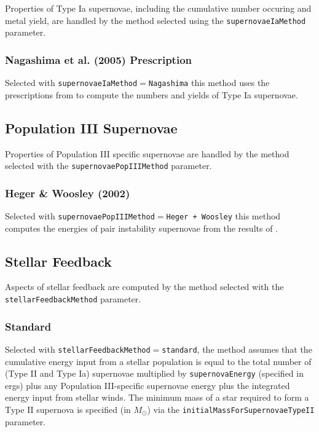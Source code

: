 Properties of Type Ia supernovae, including the cumulative number occuring and metal yield, are handled by the method selected using the {\tt supernovaeIaMethod} parameter.

\subsubsection{Nagashima et al. (2005) Prescription}

Selected with {\tt supernovaeIaMethod}$=${\tt Nagashima} this method uses the prescriptions from \cite{nagashima_metal_2005} to compute the numbers and yields of Type Ia supernovae.

\subsection{Population III Supernovae}

Properties of Population III specific supernovae are handled by the method selected with the {\tt supernovaePopIIIMethod} parameter.

\subsubsection{Heger \& Woosley (2002)}

Selected with {\tt supernovaePopIIIMethod}$=${\tt Heger + Woosley} this method computes the energies of pair instability supernovae from the results of \cite{heger_nucleosynthetic_2002}.

\subsection{Stellar Feedback}

Aspects of stellar feedback are computed by the method selected with the {\tt stellarFeedbackMethod} parameter.

\subsubsection{Standard}

Selected with {\tt stellarFeedbackMethod}$=${\tt standard}, the method assumes that the cumulative energy input from a stellar population is equal to the total number of (Type II and Type Ia) supernovae multiplied by {\tt supernovaEnergy} (specified in ergs) plus any Population III-specific supernovae energy plus the integrated energy input from stellar winds. The minimum mass of a star required to form a Type II supernova is specified (in $M_\odot$) via the {\tt initialMassForSupernovaeTypeII} parameter.

